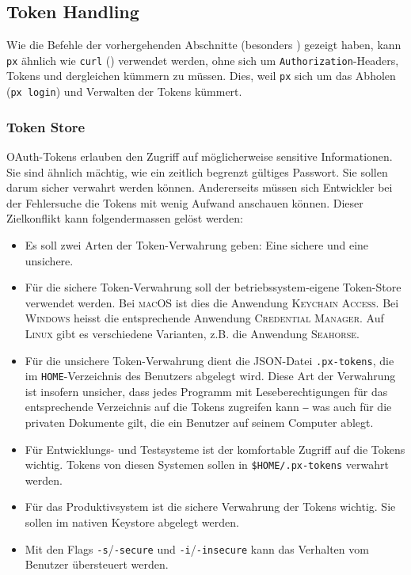 \subsection{Token Handling}
\label{sec:Konzept-Token-Store}

Wie die Befehle der vorhergehenden Abschnitte (besonders ) gezeigt haben, kann \texttt{px} ähnlich wie \texttt{curl} () verwendet werden, ohne sich um \texttt{Authorization}-Headers, Tokens und dergleichen kümmern zu müssen. Dies, weil \texttt{px} sich um das Abholen (\texttt{px login}) und Verwalten der Tokens kümmert.

\subsubsection{Token Store}

OAuth-Tokens erlauben den Zugriff auf möglicherweise sensitive Informationen. Sie sind ähnlich mächtig, wie ein zeitlich begrenzt gültiges Passwort. Sie sollen darum sicher verwahrt werden können. Andererseits müssen sich Entwickler bei der Fehlersuche die Tokens mit wenig Aufwand anschauen können. Dieser Zielkonflikt kann folgendermassen gelöst werden:

\begin{itemize}
    \item Es soll zwei Arten der Token-Verwahrung geben: Eine sichere und eine unsichere.
    \item Für die sichere Token-Verwahrung soll der betriebssystem-eigene Token-Store verwendet werden. Bei \textsc{macOS} ist dies die Anwendung \textsc{Keychain Access}. Bei \textsc{Windows} heisst die entsprechende Anwendung \textsc{Credential Manager}. Auf \textsc{Linux} gibt es verschiedene Varianten, z.B. die Anwendung \textsc{Seahorse}.
    \item Für die unsichere Token-Verwahrung dient die JSON-Datei \texttt{.px-tokens}, die im \texttt{HOME}-Verzeichnis des Benutzers abgelegt wird. Diese Art der Verwahrung ist insofern unsicher, dass jedes Programm mit Leseberechtigungen für das entsprechende Verzeichnis auf die Tokens zugreifen kann ‒ was auch für die privaten Dokumente gilt, die ein Benutzer auf seinem Computer ablegt.
    \item Für Entwicklungs- und Testsysteme ist der komfortable Zugriff auf die Tokens wichtig. Tokens von diesen Systemen sollen in \texttt{\$HOME/.px-tokens} verwahrt werden.
    \item Für das Produktivsystem ist die sichere Verwahrung der Tokens wichtig. Sie sollen im nativen Keystore abgelegt werden.
    \item Mit den Flags \texttt{-s}/\texttt{-secure} und \texttt{-i}/\texttt{-insecure} kann das Verhalten vom Benutzer übersteuert werden.
\end{itemize}

